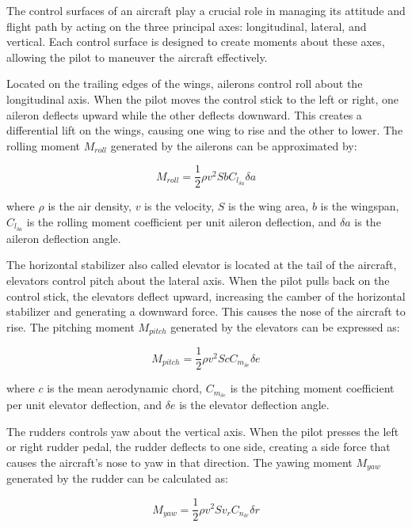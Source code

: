 The control surfaces of an aircraft play a crucial role in managing its attitude and flight path by acting on the three principal axes: longitudinal, lateral, and vertical. Each control surface is designed to create moments about these axes, allowing the pilot to maneuver the aircraft effectively.

Located on the trailing edges of the wings, ailerons control roll about the longitudinal axis. When the pilot moves the control stick to the left or right, one aileron deflects upward while the other deflects downward. This creates a differential lift on the wings, causing one wing to rise and the other to lower. The rolling moment \( M_{roll} \) generated by the ailerons can be approximated by:

\begin{equation}
    M_{roll} = \frac{1}{2} \rho v^2 S b C_{l_{\delta a}} \delta a
\end{equation}

where \( \rho \) is the air density, \( v \) is the velocity, \( S \) is the wing area, \( b \) is the wingspan, \( C_{l_{\delta a}} \) is the rolling moment coefficient per unit aileron deflection, and \( \delta a \) is the aileron deflection angle.

The horizontal stabilizer also called elevator is located at the tail of the aircraft, elevators control pitch about the lateral axis. When the pilot pulls back on the control stick, the elevators deflect upward, increasing the camber of the horizontal stabilizer and generating a downward force. This causes the nose of the aircraft to rise. The pitching moment \( M_{pitch} \) generated by the elevators can be expressed as:

\begin{equation}
    M_{pitch} = \frac{1}{2} \rho v^2 S c C_{m_{\delta e}} \delta e
\end{equation}

where \( c \) is the mean aerodynamic chord, \( C_{m_{\delta e}} \) is the pitching moment coefficient per unit elevator deflection, and \( \delta e \) is the elevator deflection angle.

The rudders controls yaw about the vertical axis. When the pilot presses the left or right rudder pedal, the rudder deflects to one side, creating a side force that causes the aircraft's nose to yaw in that direction. The yawing moment \( M_{yaw} \) generated by the rudder can be calculated as:

\begin{equation}
    M_{yaw} = \frac{1}{2} \rho v^2 S v_r C_{n_{\delta r}} \delta r
\end{equation}

